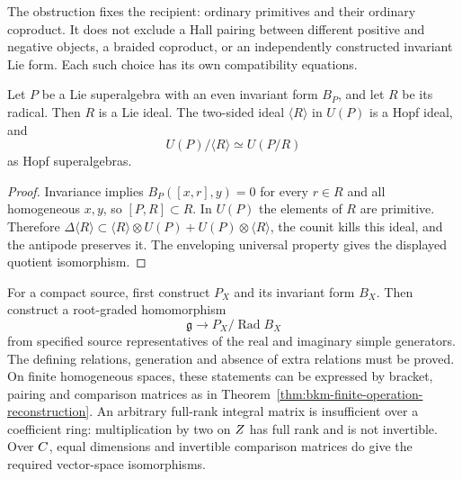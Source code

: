 The obstruction fixes the recipient: ordinary primitives and their
ordinary coproduct. It does not exclude a Hall pairing between
different positive and negative objects, a braided coproduct, or
an independently constructed invariant Lie form. Each such choice
has its own compatibility equations.

\begin{proposition}
\label{prop:bkm-lie-radical-quotient}
Let $P$ be a Lie superalgebra with an even invariant form $B_P$,
and let $R$ be its radical. Then $R$ is a Lie ideal. The two-sided
ideal $\langle R\rangle$ in $U(P)$ is a Hopf ideal, and
\[
 U(P)/\langle R\rangle\simeq U(P/R)
\]
as Hopf superalgebras.
\end{proposition}
\begin{proof}
Invariance implies $B_P([x,r],y)=0$ for every $r\in R$ and all
homogeneous $x,y$, so $[P,R]\subset R$. In $U(P)$ the elements
of $R$ are primitive. Therefore
$\Delta\langle R\rangle\subset\langle R\rangle\otimes U(P)
+U(P)\otimes\langle R\rangle$, the counit kills this ideal, and
the antipode preserves it. The enveloping universal property gives
the displayed quotient isomorphism.
\end{proof}

For a compact source, first construct $P_X$ and its invariant
form $B_X$. Then construct a root-graded homomorphism
\[
 \mathfrak g\longrightarrow P_X/\operatorname{Rad}B_X
\]
from specified source representatives of the real and imaginary
simple generators. The defining relations, generation and absence
of extra relations must be proved. On finite homogeneous spaces,
these statements can be expressed by bracket, pairing and comparison
matrices as in Theorem~\ref{thm:bkm-finite-operation-reconstruction}.
An arbitrary full-rank integral matrix is insufficient over a
coefficient ring: multiplication by two on $Z$ has full rank and
is not invertible. Over $C$, equal dimensions and invertible
comparison matrices do give the required vector-space isomorphisms.

